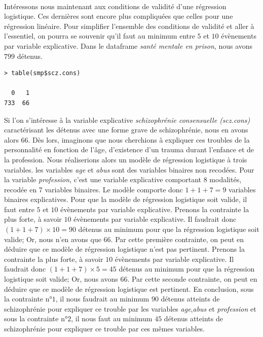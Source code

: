 \\
Intéressons nous maintenant aux conditions de validité d'une régression logistique. Ces dernières sont encore plus compliquées que celles pour une régression linéaire.\newline
Pour simplifier l'ensemble des conditions de validité et aller à l'essentiel, on pourra se souvenir qu'il faut au minimum entre $5$ et $10$ évènements par variable explicative.\newline
Dans le dataframe \textit{santé mentale en prison}, nous avons $799$ détenus.

\begin{lstlisting}[language=html]
> table(smp$scz.cons)

  0   1 
733  66 
\end{lstlisting}
Si l'on s'intéresse à la variable explicative \textit{schizophrénie consensuelle (scz.cons)} caractérisant les détenus avec une forme grave de schizophrénie, nous en avons alors 66.\newline
Dès lors, imaginons que nous cherchions à expliquer ces troubles de la personnalité en fonction de l'âge, d'existence d'un trauma durant l'enfance et de la profession. Nous réaliserions alors un modèle de régression logistique à trois variables.\newline
les variables \textit{age} et \textit{abus} sont des variables binaires non recodées. Pour la variable \textit{profession}, c'est une variable explicative comportant 8 modalités, recodée en 7 variables binaires. Le modèle comporte donc $1+1+7 = 9$ variables binaires explicatives.\newline
Pour que la modèle de régression logistique soit valide, il faut entre $5$ et $10$ évènements par variable explicative.\newline
Prenons la contrainte la plus forte, à savoir $10$ évènements par variable explicative. Il faudrait donc $(1+1+7)\times 10 = 90$ détenus au minimum pour que la régression logistique soit valide; Or, nous n'en avons que $66$. Par cette première contrainte, on peut en déduire que ce modèle de régression logistique n'est pas pertinent.\newline
Prenons la contrainte la plus forte, à savoir $10$ évènements par variable explicative. Il faudrait donc $(1+1+7)\times 5 = 45$ détenus au minimum pour que la régression logistique soit valide; Or, nous avons $66$. Par cette seconde contrainte, on peut en déduire que ce modèle de régression logistique est pertinent.\newline
En conclusion, sous la contrainte n°$1$, il nous faudrait au minimum $90$ détenus atteints de schizophrénie pour expliquer ce trouble par les variables \textit{age},\textit{abus} et \textit{profession} et sous la contrainte n°$2$, il nous faut au minimum $45$ détenus atteints de schizophrénie pour expliquer ce trouble par ces mêmes variables.

